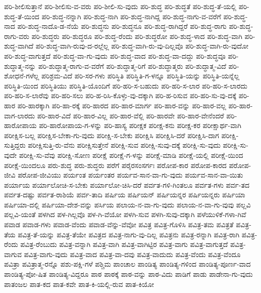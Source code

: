 {ಪರಿ-ಶೀಲಿಸುತ್ತಾನೆ
ಪರಿ-ಶೀಲಿಸು-ವ-ವರು
ಪರಿ-ಶೀಲಿ-ಸು-ವುದು
ಪರಿ-ಶುದ್ಧ
ಪರಿ-ಶುದ್ಧತೆ
ಪರಿ-ಶುದ್ಧ-ತೆ-ಯಲ್ಲಿ
ಪರಿ-ಶುದ್ಧ-ತೆ-ಯಿಂದ
ಪರಿ-ಶುದ್ಧ-ನನ್ನಾಗಿ
ಪರಿ-ಶುದ್ಧ-ನಾಗಿ
ಪರಿ-ಶುದ್ಧ-ನಾಗಿದ್ದ
ಪರಿ-ಶುದ್ಧ-ನಾಗು-ವ-ವರೆಗೆ
ಪರಿ-ಶುದ್ಧ-ನಾದ
ಪರಿ-ಶುದ್ಧ-ನಾದೊ-ಡ-ನೆಯೆ
ಪರಿ-ಶುದ್ಧನು
ಪರಿ-ಶುದ್ಧನೂ
ಪರಿ-ಶುದ್ಧ-ರಾಗಿದ್ದರೆ
ಪರಿ-ಶುದ್ಧ-ರಾಗು
ಪರಿ-ಶುದ್ಧ-ರಾಗು-ವರು
ಪರಿ-ಶುದ್ಧರು
ಪರಿ-ಶುದ್ಧರೂ
ಪರಿ-ಶುದ್ಧ-ರೆಂದು
ಪರಿ-ಶುದ್ಧರೋ
ಪರಿ-ಶುದ್ಧ-ಳಾದ
ಪರಿ-ಶುದ್ಧ-ವಾಗಿ
ಪರಿ-ಶುದ್ಧ-ವಾಗಿದೆ
ಪರಿ-ಶುದ್ಧ-ವಾಗಿ-ರುವು-ದ-ರಲ್ಲೆಲ್ಲ
ಪರಿ-ಶುದ್ಧ-ವಾಗಿ-ರು-ವು-ದಿಲ್ಲವೊ
ಪರಿ-ಶುದ್ಧ-ವಾಗಿ-ರು-ವುದೋ
ಪರಿ-ಶುದ್ಧ-ವಾಗುತ್ತದೆ
ಪರಿ-ಶುದ್ಧ-ವಾ-ಗು-ವುದು
ಪರಿ-ಶುದ್ಧ-ವಾದ
ಪರಿ-ಶುದ್ಧ-ವಾ-ದದ್ದು
ಪರಿ-ಶುದ್ಧವೂ
ಪರಿ-ಶುದ್ಧಾತ್ಮ-ನನ್ನು
ಪರಿ-ಶುದ್ಧಾತ್ಮ-ರಾಗು-ವ-ವರೆಗೆ
ಪರಿ-ಶುದ್ಧಾತ್ಮ-ರಿಗೆ
ಪರಿ-ಶುದ್ಧಾತ್ಮರು
ಪರಿ-ಶುದ್ಧಾತ್ಮ-ವಿದೆ
ಪರಿ-ಶೋಧನೆ-ಗಳೆಲ್ಲ
ಪರಿಶ್ರಮ-ವಿದೆ
ಪರಿ-ಸರ-ಗಳು
ಪರಿಸ್ಥಿತಿ
ಪರಿಸ್ಥಿತಿ-ಗ-ಳನ್ನೂ
ಪರಿಸ್ಥಿತಿ-ಯನ್ನು
ಪರಿಸ್ಥಿತಿ-ಯನ್ನೆಲ್ಲ
ಪರಿಸ್ಥಿತಿ-ಯಿಂದ
ಪರಿಸ್ಥಿತಿಯು
ಪರಿಸ್ಥಿತಿ-ಯೊಂದಿಗೆ
ಪರಿ-ಹರಿ-ಸ-ಬಹುದು
ಪರಿ-ಹರಿ-ಸ-ಲಾರ
ಪರಿ-ಹರಿ-ಸ-ಲಾರದು
ಪರಿ-ಹರಿ-ಸ-ಲಾರೆವು
ಪರಿ-ಹರಿ-ಸಲು
ಪರಿ-ಹ-ರಿಸಿ-ಕೊಳ್ಳು-ವು-ದಕ್ಕಾಗಿ
ಪರಿ-ಹ-ರಿಸುವ
ಪರಿ-ಹರಿ-ಸು-ವು-ದಕ್ಕೆ
ಪರಿ-ಹಾರ
ಪರಿ-ಹಾರಕ್ಕಾಗಿ
ಪರಿ-ಹಾ-ರಕ್ಕೆ
ಪರಿ-ಹಾರದ
ಪರಿ-ಹಾರ-ಮಾರ್ಗ
ಪರಿ-ಹಾರ-ವನ್ನು
ಪರಿ-ಹಾರ-ವಲ್ಲ
ಪರಿ-ಹಾರ-ವಾಗ-ಲಾರದು
ಪರಿ-ಹಾರ-ವಿದೆ
ಪರಿ-ಹಾರ-ವಿಲ್ಲ
ಪರಿ-ಹಾರ-ವೆಲ್ಲಿ
ಪರಿ-ಹಾರವೇ
ಪರಿ-ಹಾರ-ವೇನೆಂದರೆ
ಪರಿ-ಹಾರೋಪಾಯ
ಪರಿ-ಹಾರೋಪಾಯ-ಗ-ಳನ್ನು
ಪರಿ-ಹಾಸ್ಯ
ಪರೀಕ್ಷಕ
ಪರೀಕ್ಷ-ಕನು
ಪರೀಕ್ಷ-ಕರ
ಪರೀಕ್ಷಾರ್ಥ-ವಾಗಿ
ಪರೀಕ್ಷಿಸ-ಬಲ್ಲ
ಪರೀಕ್ಷಿಸ-ಬೇಕಾ-ಗು-ವುದು
ಪರೀಕ್ಷಿ-ಸ-ಬೇಕು
ಪರೀಕ್ಷಿಸಿ
ಪರೀಕ್ಷಿಸಿ-ದರೆ
ಪರೀಕ್ಷಿಸಿ-ದಾಗ
ಪರೀಕ್ಷಿ-ಸುತ್ತಿದ್ದರು
ಪರೀಕ್ಷಿಸುತ್ತಿ-ರು-ವೆನು
ಪರೀಕ್ಷಿಸುತ್ತೇನೆ
ಪರೀಕ್ಷಿ-ಸುವ
ಪರೀಕ್ಷಿ-ಸುವು-ದಕ್ಕೆ
ಪರೀಕ್ಷಿ-ಸು-ವುದು
ಪರೀಕ್ಷಿ-ಸು-ವುದೇ
ಪರೀಕ್ಷಿ-ಸು-ವೆವು
ಪರೀಕ್ಷಿ-ಸೋಣ
ಪರೀಕ್ಷೆ
ಪರೀಕ್ಷೆ-ಗ-ಳನ್ನು
ಪರೀಕ್ಷೆ-ಮಾಡಿ
ಪರೀಕ್ಷೆ-ಯಲ್ಲಿ
ಪರೀಕ್ಷೆ-ಯಿಂದ
ಪರೀಕ್ಷೆ-ಯಿಂದಲೂ
ಪರು-ಶುದ್ಧ
ಪರು-ಶುದ್ಧರು
ಪರೆಗೆ
ಪರೈರಸಂಸರ್ಗಃ
ಪರೋಪ-ಕಾರ
ಪರೋಪ-ಕಾರದ
ಪರೋಪ-ಜೀವಿ
ಪರೋಪ-ಜೀವಿಯು
ಪರ್ಯಂತ
ಪರ್ಯಂತರ
ಪರ್ಯವ-ಸಾನ-ವಾ-ಗು-ವುದು
ಪರ್ಯವ-ಸಾನ-ವಾ-ಯಿತು
ಪರ್ಯಾಯ
ಪರ್ಯಾಲೋಚಿ-ಸ-ಬೇಕು
ಪರ್ಯಾಲೋ-ಚಿಸಿ-ದರೆ
ಪರ್ವತ-ಗಳಿ-ಗಿಂತಲೂ
ಪರ್ವತ-ಗಳು
ಪರ್ವ-ತದ
ಪರ್ವತ-ದಷ್ಟು
ಪರ್ವತ-ರಾಶಿಯೆ
ಪರ್ವ-ತಾದಿ
ಪರ್ಷಿಯ
ಪರ್ಷಿಯನ್
ಪರ್ಷಿಯನ್ನರ
ಪರ್ಷಿಯನ್ನರು
ಪರ್ಷಿಯಾ
ಪರ್ಷಿಯಾ-ದಲ್ಲಿ
ಪರ್ಷಿಯಾ-ದೇಶ-ವನ್ನು
ಪರ್ಸಿಯ
ಪಲಾಯ-ನ-ವಾ-ಗು-ವುದು
ಪಲಾಯ-ನ-ವಾ-ಗು-ವುವು
ಪಲ್ಲವಿ
ಪಲ್ಲವಿ-ಯಂತೆ
ಪಳಗಿದ
ಪಳ-ಗಿಲ್ಲವೊ
ಪಳ-ಗಿ-ವೆಯೋ
ಪಳಗಿ-ಸುವ
ಪಳಗಿ-ಸುವು-ದಕ್ಕಾಗಿ
ಪಳೆಯುಳಿಕೆ-ಗಳಾ-ಗಿವೆ
ಪವಾಡ
ಪವಾಡ-ಗಳು
ಪವಾಡ-ವೆಂದು
ಪವಾಡ-ವೆನ್ನು-ವೆವೋ
ಪವಿತ್ರ
ಪವಿತ್ರ-ಗೊಳಿಸಿ
ಪವಿತ್ರ-ತಮ
ಪವಿತ್ರತೆ
ಪವಿತ್ರ-ತೆಯ
ಪವಿತ್ರ-ತೆ-ಯನ್ನು
ಪವಿತ್ರ-ತೆಯೇ
ಪವಿತ್ರದ
ಪವಿತ್ರ-ನಾಗು-ವು-ದಿಲ್ಲ
ಪವಿತ್ರನು
ಪವಿತ್ರ-ರನ್ನಾಗಿ
ಪವಿತ್ರ-ರಾಗಿ
ಪವಿತ್ರ-ರೆಂದು
ಪವಿತ್ರ-ರೆಂಬುದು
ಪವಿತ್ರ-ವನ್ನಾಗಿ
ಪವಿತ್ರ-ವಾಗಿ
ಪವಿತ್ರ-ವಾಗಿಟ್ಟಿರ
ಪವಿತ್ರ-ವಾಗು
ಪವಿತ್ರ-ವಾಗುತ್ತದೆ
ಪವಿತ್ರ-ವಾಗುವ
ಪವಿತ್ರ-ವಾಗು-ವುದು
ಪವಿತ್ರ-ವಾದ
ಪವಿತ್ರ-ವಾ-ದವು
ಪವಿತ್ರ-ವಾದುದು
ಪವಿತ್ರ-ವೆಂದು
ಪವಿತ್ರ-ವೆಂದೂ
ಪವಿತ್ರಾ
ಪವಿತ್ರಾತ್ಮ-ರನ್ನೊ
ಪಶು-ಪಕ್ಷಿ-ಗಳೆ
ಪಶ್ಚಿಮ
ಪಾಂಚಾಲ
ಪಾಂಡಿತ್ಯ
ಪಾಂಡಿತ್ಯ-ಗಳಿಂದ
ಪಾಂಡಿತ್ಯ-ಪೂರ್ಣ-ವಾದ
ಪಾಂಡಿತ್ಯ-ಪೋ-ಷಿತ
ಪಾಂಡಿತ್ಯ-ವಿದ್ದರೂ
ಪಾಠ
ಪಾಠಕ್ಕೆ
ಪಾಠ-ವನ್ನು
ಪಾಠ-ವಿದು
ಪಾಡಿಗೆ
ಪಾಡು
ಪಾಡೇನಾ-ಗು-ವುದು
ಪಾತಂಜಲ
ಪಾತ-ಕದ
ಪಾತ-ಕವೇ
ಪಾತ-ಕಿ-ಯಲ್ಲಿ-ರುವ
ಪಾತ-ಕಿಯೋ
}
